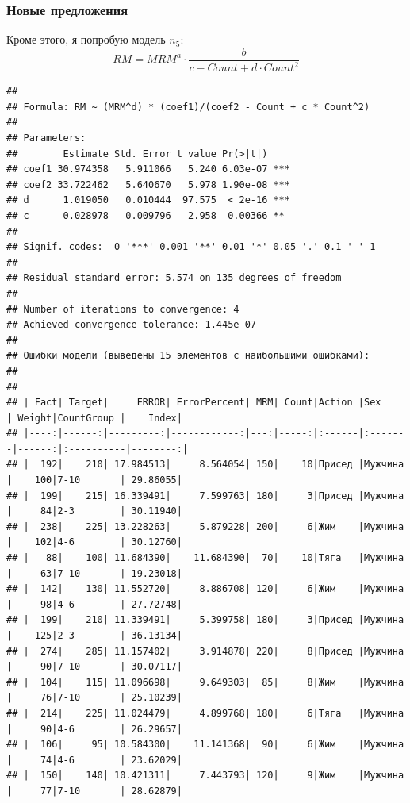 \documentclass[
]{article}
\begin{document}
\hypertarget{ux43dux43eux432ux44bux435-ux43fux440ux435ux434ux43bux43eux436ux435ux43dux438ux44f}{%
\subsubsection{Новые
предложения}\label{ux43dux43eux432ux44bux435-ux43fux440ux435ux434ux43bux43eux436ux435ux43dux438ux44f}}

Кроме этого, я попробую модель \(n_5\):
\[RM=MRM^a \cdot \frac{b}{c-Count+d \cdot Count^2}\]

\begin{verbatim}
## 
## Formula: RM ~ (MRM^d) * (coef1)/(coef2 - Count + c * Count^2)
## 
## Parameters:
##        Estimate Std. Error t value Pr(>|t|)    
## coef1 30.974358   5.911066   5.240 6.03e-07 ***
## coef2 33.722462   5.640670   5.978 1.90e-08 ***
## d      1.019050   0.010444  97.575  < 2e-16 ***
## c      0.028978   0.009796   2.958  0.00366 ** 
## ---
## Signif. codes:  0 '***' 0.001 '**' 0.01 '*' 0.05 '.' 0.1 ' ' 1
## 
## Residual standard error: 5.574 on 135 degrees of freedom
## 
## Number of iterations to convergence: 4 
## Achieved convergence tolerance: 1.445e-07
## 
## Ошибки модели (выведены 15 элементов с наибольшими ошибками): 
## 
## 
## | Fact| Target|     ERROR| ErrorPercent| MRM| Count|Action |Sex     | Weight|CountGroup |    Index|
## |----:|------:|---------:|------------:|---:|-----:|:------|:-------|------:|:----------|--------:|
## |  192|    210| 17.984513|     8.564054| 150|    10|Присед |Мужчина |    100|7-10       | 29.86055|
## |  199|    215| 16.339491|     7.599763| 180|     3|Присед |Мужчина |     84|2-3        | 30.11940|
## |  238|    225| 13.228263|     5.879228| 200|     6|Жим    |Мужчина |    102|4-6        | 30.12760|
## |   88|    100| 11.684390|    11.684390|  70|    10|Тяга   |Мужчина |     63|7-10       | 19.23018|
## |  142|    130| 11.552720|     8.886708| 120|     6|Жим    |Мужчина |     98|4-6        | 27.72748|
## |  199|    210| 11.339491|     5.399758| 180|     3|Присед |Мужчина |    125|2-3        | 36.13134|
## |  274|    285| 11.157402|     3.914878| 220|     8|Присед |Мужчина |     90|7-10       | 30.07117|
## |  104|    115| 11.096698|     9.649303|  85|     8|Жим    |Мужчина |     76|7-10       | 25.10239|
## |  214|    225| 11.024479|     4.899768| 180|     6|Тяга   |Мужчина |     90|4-6        | 26.29657|
## |  106|     95| 10.584300|    11.141368|  90|     6|Жим    |Мужчина |     74|4-6        | 23.62029|
## |  150|    140| 10.421311|     7.443793| 120|     9|Жим    |Мужчина |     77|7-10       | 28.62879|

\end{verbatim}
\end{document}

